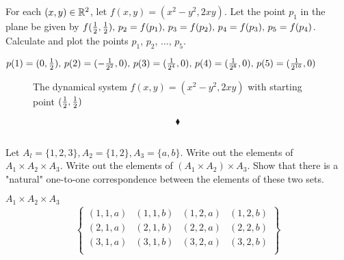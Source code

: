 \subsection{}
\begin{tcolorbox}
For each $(x, y)\in \mathbb{R}^2$, let $f(x, y) = (x^2 -y^2, 2xy)$. Let the point $p_1$ in the plane be given by $f(\frac{1}{2},\frac{1}{2}),\, p_2 = f(p_1),\, p_3 = f(p_2),\, p_4= f(p_3),\, p_5 = f(p_4)$. Calculate and plot the points $p_1,\, p_2,\,\dots,\,p_5$.
\end{tcolorbox}
$$ $$
$p(1)=(0,\frac{1}{2}), \,p(2)=(-\frac{1}{2^2},0), \,p(3)=(\frac{1}{2^4},0), \,p(4)=(\frac{1}{2^8},0), \,p(5)=(\frac{1}{2^{16}},0)$\\ 
\begin{figure}[H]%
    \centering
    
\caption{The dynamical system $f(x, y) = (x^2 -y^2, 2xy)$ with starting point $(\frac{1}{2},\frac{1}{2})$}
\label{fig:fig_p8b}
\end{figure}
$$\blacklozenge$$

\subsection{}
\begin{tcolorbox}
Let $A_l = \{1, 2, 3\}, A_2 = \{1, 2\}, A_3 = \{a,b\}$.  Write out the elements of $A_1 \times A_2\times A_3$. Write out the elements of $(A_1\times A_2) \times A_3$. Show that there is a "natural" one-to-one correspondence between the elements of these two sets. 
\end{tcolorbox}
$$ $$
$A_1 \times A_2\times A_3$\\
\begin{align*}
\left\{\begin{matrix}
(1, 1, a)&(1, 1, b)&(1, 2, a)&(1, 2, b)\\
(2, 1, a)&(2, 1, b)&(2, 2, a)&(2, 2, b)\\
(3, 1, a)&(3, 1, b)&(3, 2, a)&(3, 2, b)\\
\end{matrix}
\right\}
\end{align*}

